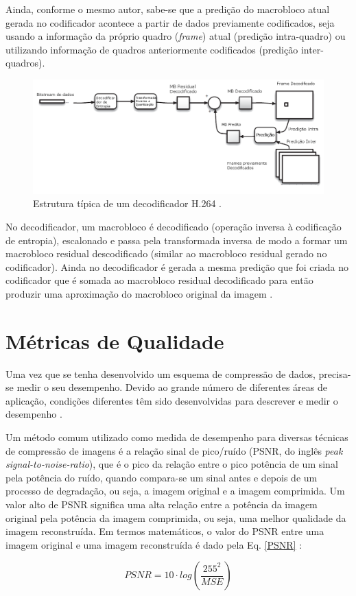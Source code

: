 Ainda, conforme o mesmo autor, sabe-se que a predição do macrobloco atual gerada no codificador acontece a partir de dados previamente codificados, seja usando a informação da próprio quadro (\textit{frame}) atual (predição intra-quadro) ou utilizando informação de quadros anteriormente codificados (predição inter-quadros).
  
\begin{figure}[h]
	\centering
	\includegraphics[scale=0.45]{figuras/H264_DECODIFICADOR.png}
	\caption{Estrutura típica de um decodificador H.264 \cite{richardson2011h}.}
	\label{H264_DECODER}
\end{figure}

No decodificador, um macrobloco é decodificado (operação inversa à codificação de entropia), escalonado e passa pela transformada inversa de modo a formar um macrobloco residual descodificado (similar ao macrobloco residual gerado no codificador). Ainda no decodificador é gerada a mesma predição que foi criada no codificador que é somada ao macrobloco residual decodificado para então produzir uma aproximação do macrobloco original da imagem \cite{richardson2011h}.

\section{Métricas de Qualidade}
\label{metricas}
Uma vez que se tenha desenvolvido um esquema de compressão de dados, precisa-se medir o seu desempenho. Devido ao grande número de diferentes áreas de aplicação, condições diferentes têm sido desenvolvidas para descrever e medir o desempenho \cite{sayood2012introduction}.

Um método comum utilizado como medida de desempenho para diversas técnicas de compressão de imagens é a relação sinal de pico/ruído (PSNR, do inglês \textit{peak signal-to-noise-ratio}), que é o pico da relação entre o pico  potência de um sinal pela potência do ruído, quando compara-se um sinal antes e depois de um processo de degradação, ou seja, a imagem original e a imagem comprimida. Um valor alto de PSNR significa uma alta relação entre a potência da imagem original pela potência da imagem comprimida, ou seja, uma melhor qualidade da imagem reconstruída. Em termos matemáticos, o valor do PSNR entre uma imagem original  e uma imagem reconstruída é dado pela Eq. \ref{PSNR} \cite{vergutz2013combinaccao} : 
\vspace{-3mm}
\begin{center}
	\begin{equation}
		\label{PSNR}
		PSNR = 10\cdot log\left(\displaystyle\frac{255^2}{MSE}\right)
	\end{equation}
\end{center}


